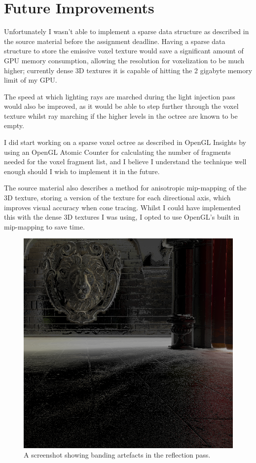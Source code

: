 \documentclass[]{acmsiggraph}
\begin{document}
\section{Future Improvements}

Unfortunately I wasn't able to implement a sparse data structure as described in the source material\cite{crassin_neyret_sainz_green_eisemann_2011} before the assignment deadline. Having a sparse data structure to store the emissive voxel texture would save a significant amount of GPU memory consumption, allowing the resolution for voxelization to be much higher; currently dense 3D textures it is capable of hitting the 2 gigabyte memory limit of my GPU.

The speed at which lighting rays are marched during the light injection pass would also be improved, as it would be able to step further through the voxel texture whilst ray marching if the higher levels in the octree are known to be empty.

I did start working on a sparse voxel octree as described in OpenGL Insights\cite{crassin_green_2012} by using an OpenGL Atomic Counter for calculating the number of fragments needed for the voxel fragment list, and I believe I understand the technique well enough should I wish to implement it in the future.

The source material\cite{crassin_neyret_sainz_green_eisemann_2011} also describes a method for anisotropic mip-mapping of the 3D texture, storing a version of the texture for each directional axis, which improves visual accuracy when cone tracing. Whilst I could have implemented this with the dense 3D textures I was using, I opted to use OpenGL's built in mip-mapping to save time.

\begin{figure}[htbp]\centering
 \includegraphics[width=1.0\linewidth]{images/banding.png}
 \caption{\label{fig:reference}A screenshot showing banding artefacts in the reflection pass.}
\end{figure}
\end{document}
